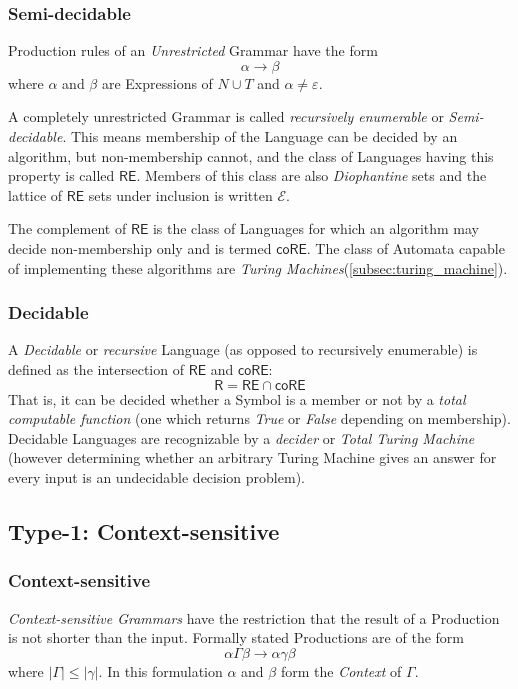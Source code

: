 \documentclass{article}
\begin{document}
\subsubsection{Semi-decidable}\label{subsec:semidecidable}
Production rules of an \emph{Unrestricted} Grammar have the form
\[
    \alpha \rightarrow \beta
\]
where $\alpha$ and $\beta$ are Expressions of $N \cup T$ and $\alpha
\neq \varepsilon$.

A completely unrestricted Grammar is called \emph{recursively
  enumerable} or \emph{Semi-decidable}. This means membership of the
Language can be decided by an algorithm, but non-membership cannot,
and the class of Languages having this property is called
$\mathsf{RE}$. Members of this class are also \emph{Diophantine} sets
and the lattice of $\mathsf{RE}$ sets under inclusion is written
$\mathcal{E}$. %

The complement of $\mathsf{RE}$ is the class of Languages for which
an algorithm may decide non-membership only and is termed
$\mathsf{coRE}$. The class of Automata capable of implementing these
algorithms are \emph{Turing Machines}(\ref{subsec:turing_machine}).

\subsubsection{Decidable}
A \emph{Decidable} or \emph{recursive} Language (as opposed to
recursively enumerable) is defined as the intersection of
$\mathsf{RE}$ and $\mathsf{coRE}$:
\[
    \mathsf{R} = \mathsf{RE} \cap \mathsf{coRE}
\]
That is, it can be decided whether a Symbol is a member or not by a
\emph{total computable function} (one which returns \emph{True} or
\emph{False} depending on membership). Decidable Languages are
recognizable by a \emph{decider} or \emph{Total Turing
  Machine}\cite{kozen97} (however determining whether an arbitrary
Turing Machine gives an answer for every input is an undecidable
decision problem).

\subsection{Type-1: Context-sensitive}

\subsubsection{Context-sensitive}\label{subsec:context_sensitive}
\emph{Context-sensitive Grammars} have the restriction that the result
of a Production is not shorter than the input. Formally stated
Productions are of the form
\[
    \alpha \Gamma \beta \rightarrow \alpha \gamma \beta
\]
where $|\Gamma| \leq |\gamma|$. In this formulation $\alpha$ and $\beta$ form
the \emph{Context} of $\Gamma$.
\end{document}
